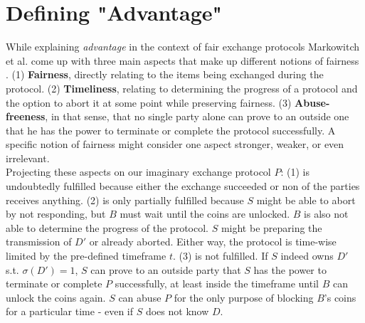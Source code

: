 \documentclass{cacthesis}
\newcounter{protocol}
\begin{document}
        \section{Defining "Advantage"}
        While explaining \textit{advantage} in the context of fair exchange protocols Markowitch et al. come up with three main aspects that make up different notions of fairness \cite{10.1007/3-540-36552-4_31}. (1) \textbf{Fairness}, directly relating to the items being exchanged during the protocol. (2) \textbf{Timeliness}, relating to determining the progress of a protocol and the option to abort it at some point while preserving fairness. (3) \textbf{Abuse-freeness}, in that sense, that no single party alone can prove to an outside one that he has the power to terminate or complete the protocol successfully. A specific notion of fairness might consider one aspect stronger, weaker, or even irrelevant. \\
        Projecting these aspects on our imaginary exchange protocol $P$: (1) is undoubtedly fulfilled because either the exchange succeeded or non of the parties receives anything. (2) is only partially fulfilled because $S$ might be able to abort by not responding, but $B$ must wait until the coins are unlocked. $B$ is also not able to determine the progress of the protocol. $S$ might be preparing the transmission of $D'$ or already aborted. Either way, the protocol is time-wise limited by the pre-defined timeframe $t$. (3) is not fulfilled. If $S$ indeed owns $D'$ s.t. $\sigma\left( D'\right) =1$, $S$ can prove to an outside party that $S$ has the power to terminate or complete $P$ successfully, at least inside the timeframe until $B$ can unlock the coins again. $S$ can abuse $P$ for the only purpose of blocking $B$'s coins for a particular time - even if $S$ does not know $D$.
        
\end{document}
